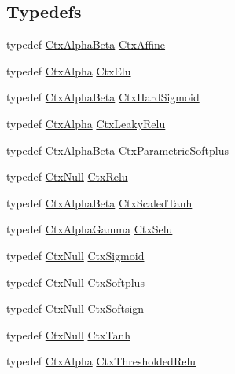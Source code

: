 \subsection*{Typedefs}
\begin{DoxyCompactItemize}
\item 
typedef \mbox{\hyperlink{structonnxruntime_1_1cuda_1_1CtxAlphaBeta}{Ctx\+Alpha\+Beta}} \mbox{\hyperlink{namespaceonnxruntime_1_1cuda_acc48ed8e0689632975871e22ba2ccecb}{Ctx\+Affine}}
\item 
typedef \mbox{\hyperlink{structonnxruntime_1_1cuda_1_1CtxAlpha}{Ctx\+Alpha}} \mbox{\hyperlink{namespaceonnxruntime_1_1cuda_ae2fa0c4b4998fa05e5ee7a68cd026f8d}{Ctx\+Elu}}
\item 
typedef \mbox{\hyperlink{structonnxruntime_1_1cuda_1_1CtxAlphaBeta}{Ctx\+Alpha\+Beta}} \mbox{\hyperlink{namespaceonnxruntime_1_1cuda_a15d037982d6d4f82d1123e1c5e7df12a}{Ctx\+Hard\+Sigmoid}}
\item 
typedef \mbox{\hyperlink{structonnxruntime_1_1cuda_1_1CtxAlpha}{Ctx\+Alpha}} \mbox{\hyperlink{namespaceonnxruntime_1_1cuda_abbe16d20bc72d57b90729fd16b026cf2}{Ctx\+Leaky\+Relu}}
\item 
typedef \mbox{\hyperlink{structonnxruntime_1_1cuda_1_1CtxAlphaBeta}{Ctx\+Alpha\+Beta}} \mbox{\hyperlink{namespaceonnxruntime_1_1cuda_abc5ef574504b4d7e402dd869c1a002b5}{Ctx\+Parametric\+Softplus}}
\item 
typedef \mbox{\hyperlink{structonnxruntime_1_1cuda_1_1CtxNull}{Ctx\+Null}} \mbox{\hyperlink{namespaceonnxruntime_1_1cuda_a705a53af67793b95d33f5dfd89a06e7a}{Ctx\+Relu}}
\item 
typedef \mbox{\hyperlink{structonnxruntime_1_1cuda_1_1CtxAlphaBeta}{Ctx\+Alpha\+Beta}} \mbox{\hyperlink{namespaceonnxruntime_1_1cuda_ad90c16faed76c8817eace65fa0606cbc}{Ctx\+Scaled\+Tanh}}
\item 
typedef \mbox{\hyperlink{structonnxruntime_1_1cuda_1_1CtxAlphaGamma}{Ctx\+Alpha\+Gamma}} \mbox{\hyperlink{namespaceonnxruntime_1_1cuda_a8bcf7930a730bb8c13757ea4ae88a908}{Ctx\+Selu}}
\item 
typedef \mbox{\hyperlink{structonnxruntime_1_1cuda_1_1CtxNull}{Ctx\+Null}} \mbox{\hyperlink{namespaceonnxruntime_1_1cuda_a97e846831dd049bddcfc8b171dcedfb7}{Ctx\+Sigmoid}}
\item 
typedef \mbox{\hyperlink{structonnxruntime_1_1cuda_1_1CtxNull}{Ctx\+Null}} \mbox{\hyperlink{namespaceonnxruntime_1_1cuda_a2f8ccdcbc49c32aaa4a99b59d34a1ef0}{Ctx\+Softplus}}
\item 
typedef \mbox{\hyperlink{structonnxruntime_1_1cuda_1_1CtxNull}{Ctx\+Null}} \mbox{\hyperlink{namespaceonnxruntime_1_1cuda_a2f21b69ccccd6ed21f811168c0128f04}{Ctx\+Softsign}}
\item 
typedef \mbox{\hyperlink{structonnxruntime_1_1cuda_1_1CtxNull}{Ctx\+Null}} \mbox{\hyperlink{namespaceonnxruntime_1_1cuda_a04d57cf277e10eb120f22d7792eec766}{Ctx\+Tanh}}
\item 
typedef \mbox{\hyperlink{structonnxruntime_1_1cuda_1_1CtxAlpha}{Ctx\+Alpha}} \mbox{\hyperlink{namespaceonnxruntime_1_1cuda_a5a031261a1b4d011e11b6d8771952bd0}{Ctx\+Thresholded\+Relu}}
\end{DoxyCompactItemize}
